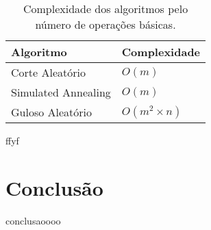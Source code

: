 \documentclass[mirror, portugues]{revdetua}
\begin{document}
\begin{table}[H]
\centering
\caption{Complexidade dos algoritmos pelo número de operações básicas.}
\label{table:numops}
\begin{tabular}{ll}
\toprule
\textbf{Algoritmo} & \textbf{Complexidade} \\
\midrule
Corte Aleatório & $O(m)$ \\
Simulated Annealing & $O(m)$ \\
Guloso Aleatório & $O(m^2 \times n)$ \\
\bottomrule
\end{tabular}
\end{table}

ffyf

\section{Conclusão}

conclusaoooo


\end{document}
